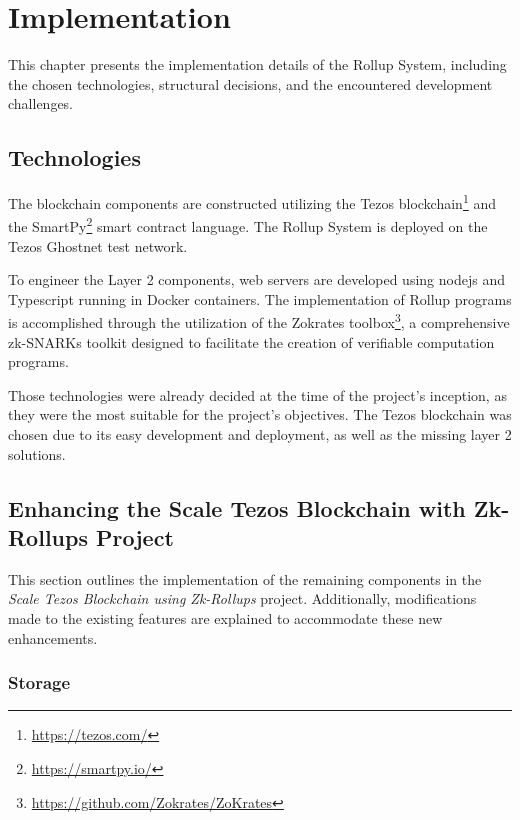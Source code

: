 \chapter{Implementation\label{cha:chapter5}}

This chapter presents the implementation details of the Rollup System, including the chosen technologies, structural decisions, and the encountered development challenges.

\section{Technologies\label{sec:technologies}}

The blockchain components are constructed utilizing the Tezos blockchain\footnote{\url{https://tezos.com/}} and the SmartPy\footnote{\url{https://smartpy.io/}} smart contract language. The Rollup System is deployed on the Tezos Ghostnet test network.

To engineer the Layer 2 components, web servers are developed using nodejs and Typescript running in Docker containers. The implementation of Rollup programs is accomplished through the utilization of the Zokrates toolbox\footnote{\url{https://github.com/Zokrates/ZoKrates}}, a comprehensive zk-SNARKs toolkit designed to facilitate the creation of verifiable computation programs.

Those technologies were already decided at the time of the project's inception, as they were the most suitable for the project's objectives. The Tezos blockchain was chosen due to its easy development and deployment, as well as the missing layer 2 solutions.

\section{Enhancing the Scale Tezos Blockchain with Zk-Rollups Project}
This section outlines the implementation of the remaining components in the \textit{Scale Tezos Blockchain using Zk-Rollups} project. Additionally, modifications made to the existing features are explained to accommodate these new enhancements.

\subsection{Storage}

